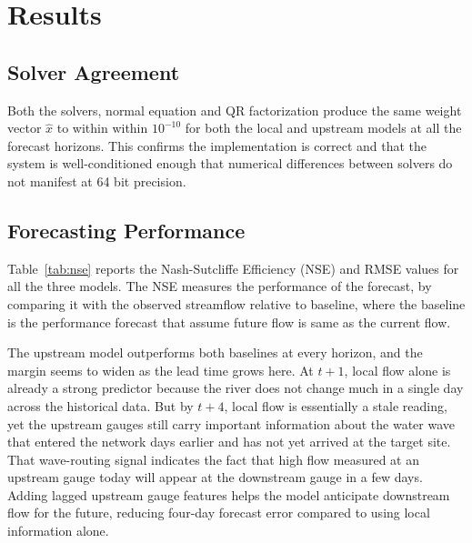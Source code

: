 \documentclass[10pt, twocolumn]{article}
\begin{document}
\section{Results}

\subsection{Solver Agreement}

Both the solvers, normal equation and QR factorization produce the same weight vector $\hat{x}$ to within within $10^{-10}$ for both the local and upstream models at all the forecast horizons. This confirms the implementation is correct and that the system is well-conditioned enough
that numerical differences between solvers do not manifest at 64 bit precision.

\subsection{Forecasting Performance}

Table~\ref{tab:nse} reports the Nash-Sutcliffe Efficiency (NSE) and RMSE values for all the three models. The NSE measures the performance of the forecast, by comparing it with the observed streamflow relative to baseline, where the baseline is the performance forecast that assume future flow is same as the current flow. 

The upstream model outperforms both baselines at every horizon, and the margin seems to widen as the lead time grows here. At $t{+}1$, local flow alone is already a strong predictor because the river does not change much in a single day across the historical data. But by $t{+}4$,
local flow is essentially a stale reading, yet the upstream gauges still carry important information about the water wave that entered the network days earlier and has not yet arrived at the target site. That wave-routing signal indicates the fact that high
flow measured at an upstream gauge today will appear at the downstream gauge in
a few days. Adding lagged upstream gauge features helps the model anticipate downstream flow for the future, reducing four-day forecast error compared to using local information alone.
\end{document}
